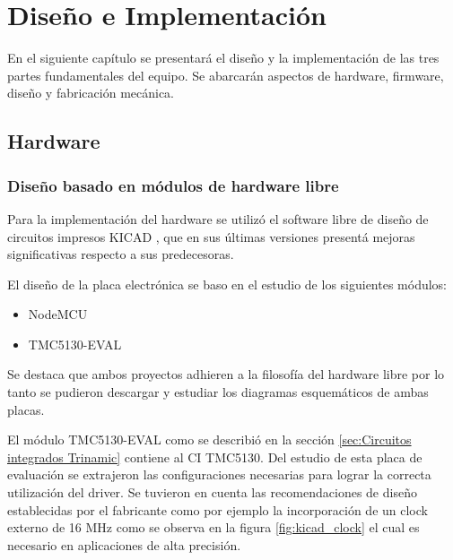 
\chapter{Diseño e Implementación} %

\label{Chapter3} %
En el siguiente capítulo se presentará el diseño y la implementación de las tres partes fundamentales del equipo. Se abarcarán aspectos de hardware, firmware, diseño y fabricación mecánica.
\section{Hardware}
\subsection{Diseño basado en módulos de hardware libre}

Para la implementación del hardware se utilizó el software libre de diseño de circuitos impresos KICAD \citep{web_kicad}, que en sus últimas versiones presentá mejoras significativas respecto a sus predecesoras.

El diseño de la placa electrónica se baso en el estudio de los siguientes módulos:
\begin{itemize}
\item NodeMCU \citep{web_nodemcu}
\item TMC5130-EVAL \citep{3_web_trinamic_placa}	
\end{itemize}
Se destaca que ambos proyectos adhieren a la filosofía del hardware libre por lo tanto se pudieron descargar y estudiar los diagramas esquemáticos de ambas placas. 

El módulo TMC5130-EVAL como se describió en la sección \ref{sec:Circuitos integrados Trinamic} contiene al CI TMC5130. Del estudio de esta placa de evaluación se extrajeron las configuraciones necesarias para lograr la correcta utilización del driver. Se tuvieron en cuenta las recomendaciones de diseño establecidas por el fabricante como por ejemplo la incorporación de un clock externo de 16 MHz como se observa en la figura \ref{fig:kicad_clock} el cual es necesario en aplicaciones de alta precisión. 

